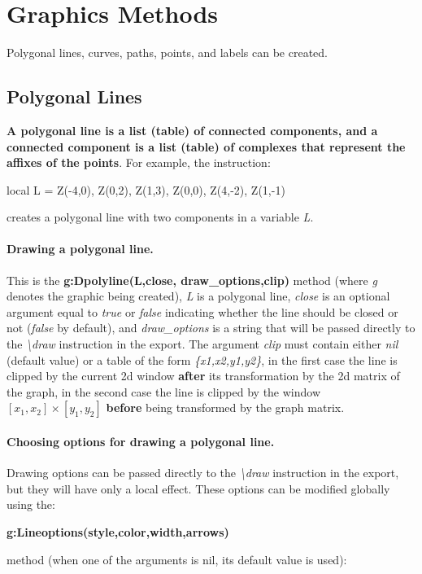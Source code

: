 \section{Graphics Methods}

Polygonal lines, curves, paths, points, and labels can be created.

\subsection{Polygonal Lines}

\textbf{A polygonal line is a list (table) of connected components, and a connected component is a list (table) of complexes that represent the affixes of the points}. For example, the instruction:
\begin{Luacode}
local L = { {Z(-4,0), Z(0,2), Z(1,3)}, {Z(0,0), Z(4,-2), Z(1,-1)} }
\end{Luacode}
creates a polygonal line with two components in a variable \emph{L}.

\paragraph{Drawing a polygonal line.}

This is the \textbf{g:Dpolyline(L,close, draw\_options,clip)} method (where \emph{g} denotes the graphic being created), \emph{L} is a polygonal line, \emph{close} is an optional argument equal to \emph{true} or \emph{false} indicating whether the line should be closed or not (\emph{false} by default), and \emph{draw\_options} is a string that will be passed directly to the \emph{\textbackslash draw} instruction in the export. The argument \emph{clip} must contain either \emph{nil} (default value) or a table of the form \emph{\{x1,x2,y1,y2\}}, in the first case the line is clipped by the current 2d window \textbf{after} its transformation by the 2d matrix of the graph, in the second case the line is clipped by the window $[x_1,x_2]\times[y_1,y_2]$ \textbf{before} being transformed by the graph matrix.


\paragraph{Choosing options for drawing a polygonal line.}

Drawing options can be passed directly to the \emph{\textbackslash draw} instruction in the export, but they will have only a local effect. These options can be modified globally using the:
\par\hfil\textbf{g:Lineoptions(style,color,width,arrows)}\hfil\par
 method (when one of the arguments is nil, its default value is used):

